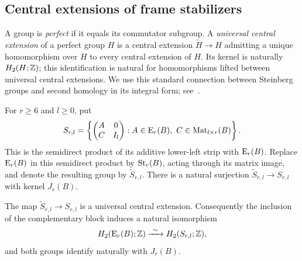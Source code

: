 \subsection{Central extensions of frame stabilizers}

A group is \emph{perfect} if it equals its commutator subgroup.
A \emph{universal central extension} of a perfect group $H$ is a central
extension $\widetilde H\to H$ admitting a unique homomorphism over $H$
to every central extension of $H$. Its kernel is naturally
$H_2(H;\mathbb Z)$; this identification is natural for homomorphisms lifted
between universal central extensions. We use this standard connection
between Steinberg groups and second homology in its integral form;
see~\cite[Theorems~III.5.4 and III.5.5]{WeibelK}.

For $r\geq6$ and $l\geq0$, put
\begin{equation}\label{eq:frame-stabilizer}
 S_{r,l}=
 \left\{\begin{pmatrix}A&0\\ C&I_l\end{pmatrix}:
 A\in\operatorname{E}_r(B),\ C\in\operatorname{Mat}_{l\times r}(B)\right\}.
\end{equation}
This is the semidirect product of its additive lower-left strip with
$\operatorname{E}_r(B)$. Replace $\operatorname{E}_r(B)$ in this semidirect product by
$\operatorname{St}_r(B)$, acting through its matrix image, and denote the resulting
group by $\widetilde S_{r,l}$. There is a natural surjection
$\widetilde S_{r,l}\to S_{r,l}$ with kernel $J_r(B)$.

\begin{lemma}\label{lem:stabilizer-uce}
The map $\widetilde S_{r,l}\to S_{r,l}$ is a universal central
extension. Consequently the inclusion of the complementary block
induces a natural isomorphism
\begin{equation}\label{eq:stabilizer-homology}
 H_2(\operatorname{E}_r(B);\mathbb Z)\xrightarrow{\ \sim\ }
 H_2(S_{r,l};\mathbb Z),
\end{equation}
and both groups identify naturally with $J_r(B)$.
\end{lemma}

